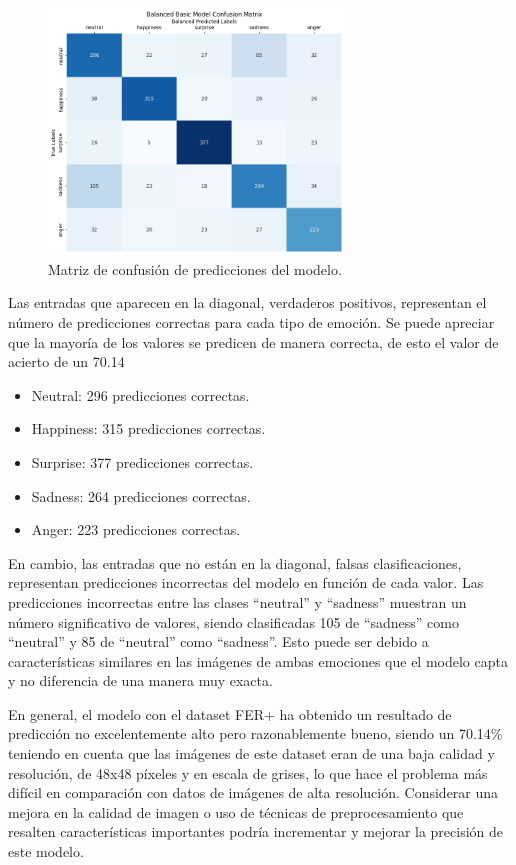 \documentclass[12pt]{report} %
\begin{document}
\begin{figure}[H]
	\centering
	\includegraphics[width=0.7\textwidth]{matrizConfusion.png}
	\caption{Matriz de confusión de predicciones del modelo.}
	\label{fig:imagen32}
\end{figure}

Las entradas que aparecen en la diagonal, verdaderos positivos, representan el número de predicciones correctas para cada tipo de emoción. Se puede apreciar que la mayoría de los valores se predicen de manera correcta, de esto el valor de acierto de un 70.14%

\begin{itemize}

    \item Neutral: 296 predicciones correctas.
    \item Happiness: 315 predicciones correctas. 
    \item Surprise: 377 predicciones correctas. 
    \item Sadness: 264 predicciones correctas.
    \item Anger: 223 predicciones correctas. 

\end{itemize}

En cambio, las entradas que no están en la diagonal, falsas clasificaciones, representan predicciones incorrectas del modelo en función de cada valor. Las predicciones incorrectas entre las clases “neutral” y “sadness” muestran un número significativo de valores, siendo clasificadas 105 de “sadness” como “neutral” y 85 de “neutral” como “sadness”. Esto puede ser debido a características similares en las imágenes de ambas emociones que el modelo capta y no diferencia de una manera muy exacta.

En general, el modelo con el dataset FER+ ha obtenido un resultado de predicción no excelentemente alto pero razonablemente bueno, siendo un 70.14\% teniendo en cuenta que las imágenes de este dataset eran de una baja calidad y resolución, de 48x48 píxeles y en escala de grises, lo que hace el problema más difícil en comparación con datos de imágenes de alta resolución. Considerar una mejora en la calidad de imagen o uso de técnicas de preprocesamiento que resalten características importantes podría incrementar y mejorar la precisión de este modelo.
\end{document}
